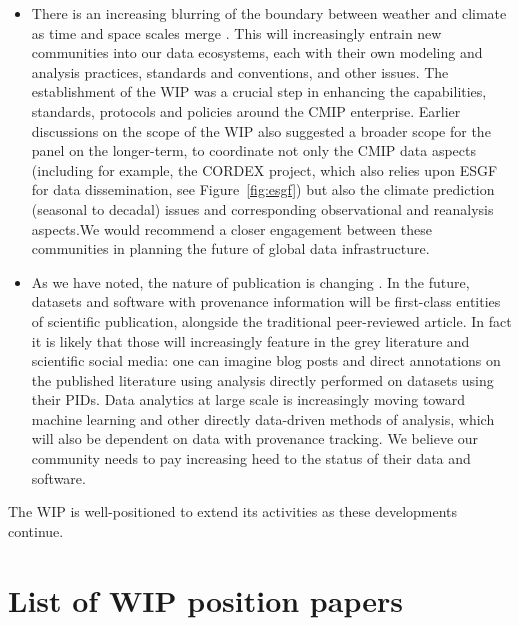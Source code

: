 \documentclass[gmd,manuscript]{copernicus}
\newcommand{\pipref}[1] {\citep{ref:#1}}
\newcommand{\figref}[1] {\mbox{Figure   \ref{fig:#1}}}
\begin{document}
\begin{itemize}
\item There is an increasing blurring of the boundary between weather
  and climate as time and space scales merge \pipref{hoskins2013}.
  This will increasingly entrain new communities into our data
  ecosystems, each with their own modeling and analysis practices,
  standards and conventions, and other issues. The establishment of
  the WIP was a crucial step in enhancing the capabilities, standards,
  protocols and policies around the CMIP enterprise. Earlier
  discussions on the scope of the WIP also suggested a broader scope
  for the panel on the longer-term, to coordinate not only the CMIP
  data aspects (including for example, the CORDEX project, which also
  relies upon ESGF for data dissemination, see \figref{esgf}) but also
  the climate prediction (seasonal to decadal) issues and
  corresponding observational and reanalysis aspects.We would
  recommend a closer engagement between these communities in planning
  the future of global data infrastructure.
\item As we have noted, the nature of publication is changing
  \citep[see e.g][]{ref:davidetal2016}. In the future, datasets and
  software with provenance information will be first-class entities of
  scientific publication, alongside the traditional peer-reviewed
  article. In fact it is likely that those will increasingly feature
  in the grey literature and scientific social media: one can imagine
  blog posts and direct annotations on the published literature using
  analysis directly performed on datasets using their PIDs. Data
  analytics at large scale is increasingly moving toward machine
  learning and other directly data-driven methods of analysis, which
  will also be dependent on data with provenance tracking. We believe our
  community needs to pay increasing heed to the status of their data
  and software.
\end{itemize}

The WIP is well-positioned to extend its activities as these developments continue.

\appendix

\section{List of WIP position papers}
\label{sec:wip}
\end{document}
